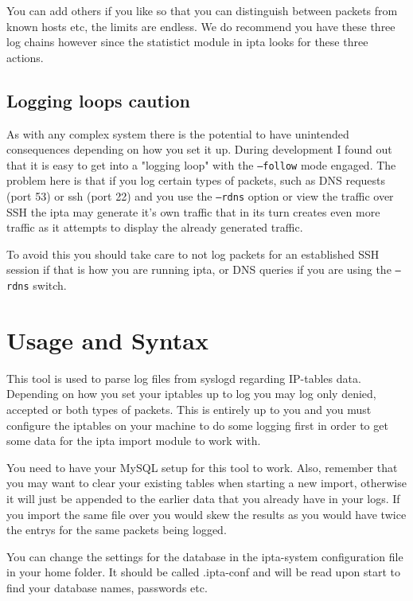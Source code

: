 \documentclass[english,twoside,openright,a4paper,12pt]{article}
\begin{document}
You can add others if you like so that you can distinguish between
packets from known hosts etc, the limits are endless. We do recommend
you have these three log chains however since the statistict module in
ipta looks for these three actions.

\subsection{Logging loops caution}

As with any complex system there is the potential to have unintended
consequences depending on how you set it up. During development I
found out that it is easy to get into a "logging loop" with the
\texttt{--follow} mode engaged. The problem here is that if you log
certain types of packets, such as DNS requests (port 53) or ssh (port
22) and you use the \texttt{--rdns} option or view the traffic over
SSH the ipta may generate it's own traffic that in its turn creates
even more traffic as it attempts to display the already generated
traffic. 

To avoid this you should take care to not log packets for an
established SSH session if that is how you are running ipta, or DNS
queries if you are using the \texttt{--rdns} switch.



\section{Usage and Syntax}

This tool is used to parse log files from syslogd regarding IP-tables
data. Depending on how you set your iptables up to log you may log
only denied, accepted or both types of packets. This is entirely up to
you and you must configure the iptables on your machine to do some
logging first in order to get some data for the ipta import module to
work with.
 
You need to have your MySQL setup for this tool to work. Also,
remember that you may want to clear your existing tables when starting
a new import, otherwise it will just be appended to the earlier data
that you already have in your logs. If you import the same file over
you would skew the results as you would have twice the entrys for the
same packets being logged.
 
You can change the settings for the database in the ipta-system
configuration file in your home folder. It should be called .ipta-conf
and will be read upon start to find your database names, passwords
etc. 
\end{document}
